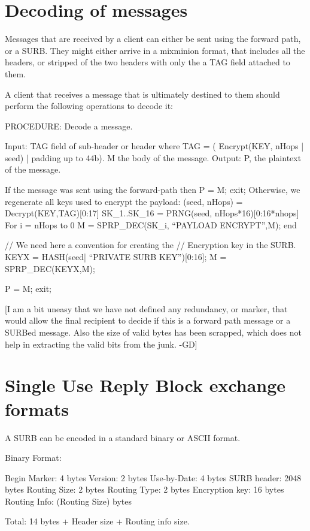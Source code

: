 \section{Decoding of messages}

Messages that are received by a client can either be sent using the
forward path, or a SURB. They might either arrive in a mixminion
format, that includes all the headers, or stripped of the two headers
with only the a TAG field attached to them.

A client that receives a message that is ultimately destined to them
should perform the following operations to decode it:

PROCEDURE: Decode a message.

Input:  TAG field of sub-header or header where 
        TAG = ( Encrypt(KEY, nHops | seed) | padding up to 44b).
        M the body of the message.
Output: P, the plaintext of the message.

	If the message was sent using the forward-path then 
		P = M; exit;
	Otherwise, we regenerate all keys used to encrypt the payload:
		(seed, nHops) = Decrypt(KEY,TAG)[0:17]
		SK_1..SK_16 = PRNG(seed, nHops*16)[0:16*nhops]
		For i = nHops to 0
			M = SPRP_DEC(SK_i, ``PAYLOAD ENCRYPT'',M);
		end

		// We need here a convention for creating the
		//   Encryption key in the SURB.
		KEYX = HASH(seed| ``PRIVATE SURB KEY'')[0:16];
		M = SPRP_DEC(KEYX,M);
		
		P = M; exit;

[I am a bit uneasy that we have not defined any redundancy, or marker,
that would allow the final recipient to decide if this is a forward
path message or a SURBed message. Also the size of valid bytes has
been scrapped, which does not help in extracting the valid bits from
the junk. -GD]

\section{Single Use Reply Block exchange formats}

A SURB can be encoded in a standard binary or ASCII format.

Binary Format:

   Begin Marker: 4 bytes
   Version:      2 bytes
   Use-by-Date:  4 bytes
   SURB header:  2048 bytes
   Routing Size: 2 bytes
   Routing Type: 2 bytes
   Encryption key: 16 bytes
   Routing Info: (Routing Size) bytes

   Total: 14 bytes + Header size + Routing info size.

